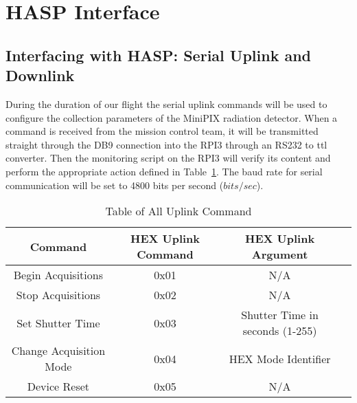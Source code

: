 \section{HASP Interface}
\label{sec:HaspInterface}

\subsection{Interfacing with HASP: Serial Uplink and Downlink}
During the duration of our flight the serial uplink commands will be used to configure the collection parameters of the MiniPIX radiation detector. When a command is received from the mission control team, it will be transmitted straight through the DB9 connection into the RPI3 through an RS232 to ttl converter. Then the monitoring script on the RPI3 will verify its content and perform the appropriate action defined in Table~\ref{tab:All-Commands}. The baud rate for serial communication will be set to 4800 bits per second ($bits/sec$). 


\begin{table}[!ht]
\centering
\caption{Table of All Uplink Command} 
\label{tab:All-Commands}
\bigskip
\begin{tabular}{|c|c|c|c|}
\hline
\multicolumn{1}{|c|}{\bfseries Command} & \multicolumn{1}{c|}{\bfseries HEX Uplink Command} & \multicolumn{1}{c|}{\bfseries HEX Uplink Argument}\\
\hline
    Begin Acquisitions 		& 0x01	 & N/A			    	    \\ \hline 
    Stop Acquisitions 		& 0x02	 & N/A			            \\ \hline
    Set Shutter Time		& 0x03   & Shutter Time in seconds (1-255)  \\ \hline %
    Change Acquisition Mode    	& 0x04 	 & HEX Mode Identifier 	            \\ \hline
    Device Reset		& 0x05 	 & N/A				    \\ \hline
    
\end{tabular}
\medskip
\end{table}

